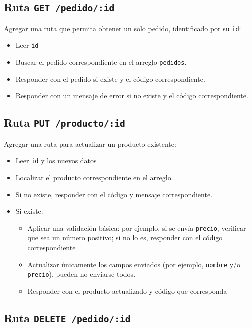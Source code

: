 \documentclass[11pt,a4paper]{article}
\begin{document}
\subsection{Ruta \texttt{GET /pedido/:id}}

Agregar una ruta que permita obtener un solo pedido, identificado por su \texttt{id}:

\begin{itemize}
	\item Leer \texttt{id} %
	\item Buscar el pedido correspondiente en el arreglo \texttt{pedidos}.
	\item Responder con el pedido %
	si existe y el código correspondiente.
	\item Responder con un mensaje de error si no existe y el código correspondiente. %
\end{itemize}

\subsection{Ruta \texttt{PUT /producto/:id}}

Agregar una ruta para actualizar un producto existente:

\begin{itemize}
	\item Leer \texttt{id} %
	y los nuevos datos %
	\item Localizar el producto correspondiente en el arreglo.
	\item Si no existe, responder con el código y mensaje correspondiente. %
	\item Si existe:
	\begin{itemize}
		\item Aplicar una validación básica: por ejemplo, si se envía \texttt{precio}, verificar que sea un número positivo; si no lo es, responder con el código correspondiente %
		\item Actualizar únicamente los campos enviados (por ejemplo, \texttt{nombre} y/o \texttt{precio}), pueden no enviarse todos.
		\item Responder con el producto actualizado y código que corresponda %
	\end{itemize}
\end{itemize}

\subsection{Ruta \texttt{DELETE /pedido/:id}}
\end{document}
